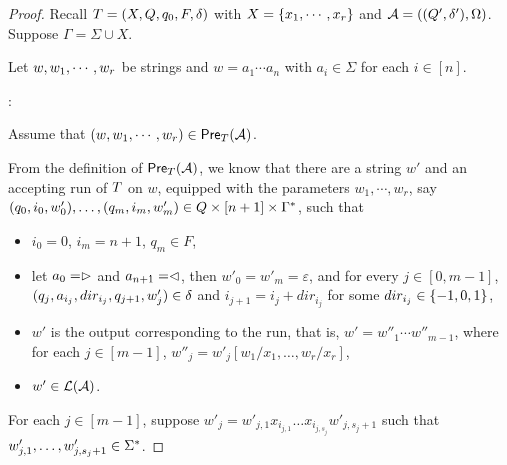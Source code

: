 \begin{proof}
Recall $T = (X, Q, q_0, F, \delta)$ with $X= \{x_1,\cdots, x_r\}$ and $\mathcal{A} =( (Q', \delta'), \Omega)$. 
Suppose $\Gamma = \Sigma \cup X$. 

Let $w, w_1, \cdots, w_r$ be strings and $w = a_1 \cdots a_n$ with $a_i \in \Sigma$ for each $i \in [n]$.

\smallskip

: 

\smallskip

Assume that $(w, w_1,\cdots, w_r) \in \textsf{Pre}_{T}(\mathcal{A})$.


From the definition of $\textsf{Pre}_{T}(\mathcal{A})$, we know that there are a string $w' $ and an accepting run of $T$ on $w$, equipped with the parameters $w_1,\cdots, w_r$, say $(q_0, i_0, w'_0),\ldots, (q_m, i_m, w'_m) \in Q \times [n+1] \times \Gamma^*$, such that 
%
\begin{itemize}
\item $i_0=0$, $i_m = n+1$, $q_m \in F$, 
%
\item let $a_0 = \vartriangleright$ and $a_{n+1} = \vartriangleleft$,  then $w'_0 = w'_m = \varepsilon$, and for every $j \in [0, m-1]$, $(q_j, a_{i_j}, dir_{i_j}, q_{j+1}, w'_j) \in
        \delta$ and $i_{j+1} = i_j + dir_{i_j}$ for some $dir_{i_j} \in \{-1, 0, 1\}$, 
 \item $w'$ is the output corresponding to the run, that is, $ w' = w''_1 \cdots w''_{m-1}$, where for each $j \in [m-1]$, $w''_j = w'_j[w_1/x_1,\ldots, w_r/x_r]$,
 \item  $w' \in \mathcal{L}(\mathcal{A})$.
\end{itemize}

For each $j \in [m-1]$, suppose $w'_j = w'_{j, 1} x_{i_{j, 1}} \ldots x_{i_{j, s_j}} w'_{j, s_j+1}$ such that $w'_{j,1}, \ldots, w'_{j, s_j +1 } \in \Sigma^*$.


\end{proof}
